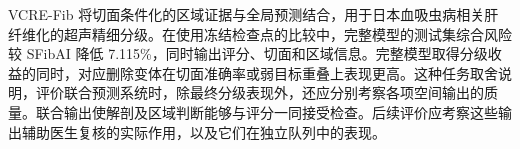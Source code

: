 VCRE-Fib 将切面条件化的区域证据与全局预测结合，用于日本血吸虫病相关肝纤维化的超声精细分级。在使用冻结检查点的比较中，完整模型的测试集综合风险较 SFibAI 降低 7.115\%，同时输出评分、切面和区域信息。完整模型取得分级收益的同时，对应删除变体在切面准确率或弱目标重叠上表现更高。这种任务取舍说明，评价联合预测系统时，除最终分级表现外，还应分别考察各项空间输出的质量。联合输出使解剖及区域判断能够与评分一同接受检查。后续评价应考察这些输出辅助医生复核的实际作用，以及它们在独立队列中的表现。
